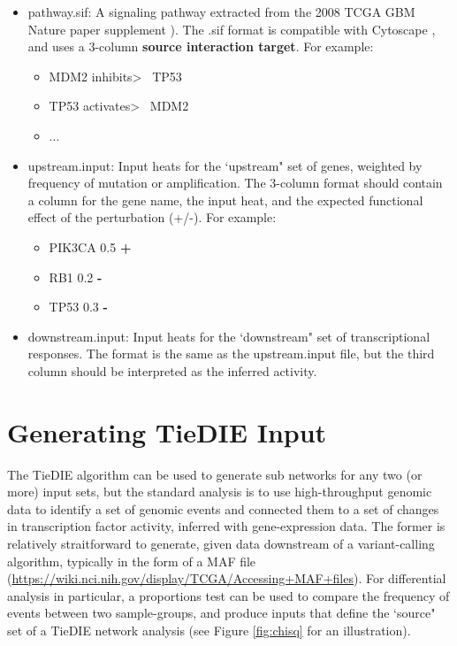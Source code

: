 \documentclass[11pt]{report}
\begin{document}
	\begin{itemize}
	\item pathway.sif: A signaling pathway extracted from the 2008 TCGA GBM Nature paper supplement \cite{TCGA08}). The .sif format is
	compatible with Cytoscape \cite{Cytoscape}, and uses a 3-column \textbf{source interaction target}. For example: 
	\begin{itemize}	
	
		\item MDM2	inhibits\textgreater	~ TP53
		\item TP53	activates\textgreater	~ MDM2
		\item ...
	\end{itemize}
	
	\item upstream.input: Input heats for the `upstream" set of genes, weighted by frequency of mutation or amplification. The 3-column format
	should contain a column for the gene name, the input heat, and the expected functional effect of the perturbation (+/-). For example:
	\begin{itemize}	
		\item PIK3CA	0.5	\textbf{+}
		\item RB1	0.2	 \textbf{-}
		\item TP53 0.3   \textbf{-}
	\end{itemize}	
	\item downstream.input: Input heats for the `downstream" set of transcriptional responses. The format is the same as the upstream.input file,
	but the third column should be interpreted as the inferred activity. 

	\end{itemize}

\section{Generating TieDIE Input}

\noindent The TieDIE algorithm can be used to generate sub networks for any two (or more) input sets, but the standard analysis is to 
use high-throughput genomic data to identify a set of genomic events and connected them to a set of changes in transcription
factor activity, inferred with gene-expression data. The former is relatively straitforward to generate, given data downstream of
a variant-calling algorithm, typically in the form of a MAF file (\url{https://wiki.nci.nih.gov/display/TCGA/Accessing+MAF+files}). 
For differential analysis in particular, a proportions test can be used to compare the frequency of events between two sample-groups, 
and produce inputs that define the `source" set of a TieDIE network analysis (see Figure \ref{fig:chisq} for an illustration). 
\end{document}
